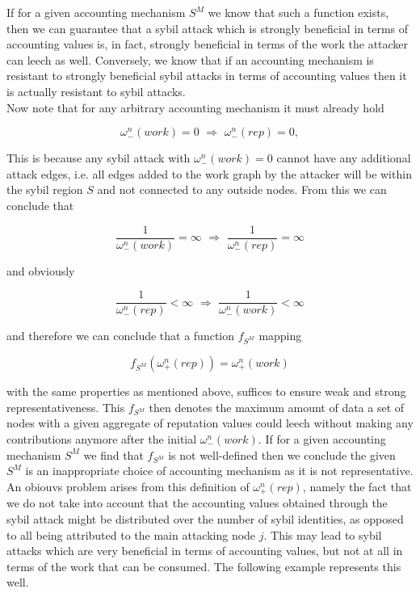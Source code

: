 \documentclass[11pt,a4paper]{article}
\theoremstyle{definition}
\theoremstyle{theorem}
\theoremstyle{proposition}
\theoremstyle{corollary}
\theoremstyle{lemma}
\theoremstyle{example}
\theoremstyle{remark}
\begin{document}
\noindent{}If for a given accounting mechanism $S^M$ we know that such a function exists, then we can guarantee that a sybil attack which is strongly beneficial in terms of accounting values is, in fact, strongly beneficial in terms of the work the attacker can leech as well. Conversely, we know that if an accounting mechanism is resistant to strongly beneficial sybil attacks in terms of accounting values then it is actually resistant to sybil attacks. \vspace{1em}\\

\noindent{}Now note that for any arbitrary accounting mechanism it must already hold

\[
\omega_{-}^{n}(work)=0 \,\,\Longrightarrow \,\, \omega_{-}^{n}(rep)=0,
\]

\noindent{}This is because any sybil attack with $\omega_{-}^{n}(work)=0$ cannot have any additional attack edges, i.e. all edges added to the work graph by the attacker will be within the sybil region $S$ and not connected to any outside nodes. From this we can conclude that 

\[
\frac{1}{\omega_{-}^{n}(work)} = \infty \,\, \Longrightarrow \,\, \frac{1}{\omega_{-}^{n}(rep)} = \infty
\]

\noindent{}and obviously

\[
\frac{1}{\omega_{-}^{n}(rep)} < \infty \,\, \Longrightarrow \,\, \frac{1}{\omega_{-}^{n}(work)} < \infty
\]

\noindent{}and therefore we can conclude that a function $f_{S^M}$ mapping 

\[
f_{S^M}(\omega^n_{+}(rep)) = \omega^n_{+}(work)
\]

\noindent{}with the same properties as mentioned above, suffices to ensure weak and strong representativeness. This $f_{S^M}$ then denotes the maximum amount of data a set of nodes with a given aggregate of reputation values could leech without making any contributions anymore after the initial $\omega_{-}^{n}(work)$. If for a given accounting mechanism $S^M$ we find that $f_{S^M}$ is not well-defined then we conclude the given $S^M$ is an inappropriate choice of accounting mechanism as it is not representative.\vspace{1em}\\

\noindent{}An obiouvs problem arises from this definition of $\omega_{+}^{n}(rep)$, namely the fact that we do not take into account that the accounting values obtained through the sybil attack might be distributed over the number of sybil identities, as opposed to all being attributed to the main attacking node $j$. This may lead to sybil attacks which are very beneficial in terms of accounting values, but not at all in terms of the work that can be consumed. The following example represents this well.
\end{document}
